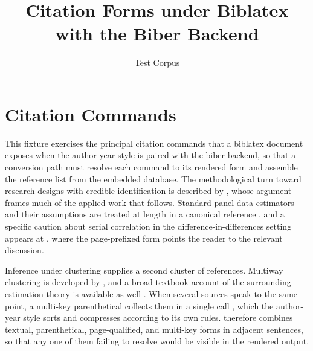 \documentclass[11pt]{article}
\title{Citation Forms under Biblatex with the Biber Backend}
\author{Test Corpus}
\date{}
\begin{document}
\maketitle

\section{Citation Commands}
\label{sec:citations}

This fixture exercises the principal citation commands that a biblatex document
exposes when the author-year style is paired with the biber backend, so that a
conversion path must resolve each command to its rendered form and assemble the
reference list from the embedded database. The methodological turn toward
research designs with credible identification is described by \textcite{angrist2010},
whose argument frames much of the applied work that follows. Standard panel-data
estimators and their assumptions are treated at length in a canonical reference
\parencite{wooldridge2010}, and a specific caution about serial correlation in
the difference-in-differences setting appears at \parencite[15]{bertrand2004},
where the page-prefixed form points the reader to the relevant discussion.

Inference under clustering supplies a second cluster of references. Multiway
clustering is developed by \autocite{cameron2011}, and a broad textbook account
of the surrounding estimation theory is available as well \autocite{greene2018}.
When several sources speak to the same point, a multi-key parenthetical collects
them in a single call \parencite{wooldridge2010,greene2018}, which the
author-year style sorts and compresses according to its own rules. 
therefore combines textual, parenthetical, page-qualified, and multi-key forms in
adjacent sentences, so that any one of them failing to resolve would be visible
in the rendered output.

\printbibliography
\end{document}
